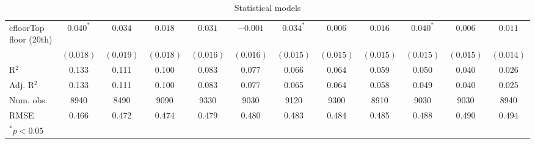 \begin{table}
\begin{center}
\begin{tabular}{l c c c c c c c c c c c }
cfloorTop floor (20th)                   & $0.040^{*}$  & $0.034$      & $0.018$      & $0.031$      & $-0.001$     & $0.034^{*}$  & $0.006$      & $0.016$      & $0.040^{*}$  & $0.006$      & $0.011$      \\
                                         & $(0.018)$    & $(0.019)$    & $(0.018)$    & $(0.016)$    & $(0.016)$    & $(0.015)$    & $(0.015)$    & $(0.015)$    & $(0.015)$    & $(0.015)$    & $(0.014)$    \\
\hline
R$^2$                                    & 0.133        & 0.111        & 0.100        & 0.083        & 0.077        & 0.066        & 0.064        & 0.059        & 0.050        & 0.040        & 0.026        \\
Adj. R$^2$                               & 0.133        & 0.111        & 0.100        & 0.083        & 0.077        & 0.065        & 0.064        & 0.058        & 0.049        & 0.040        & 0.025        \\
Num. obs.                                & 8940         & 8490         & 9090         & 9330         & 9030         & 9120         & 9300         & 8910         & 9030         & 9030         & 8940         \\
RMSE                                     & 0.466        & 0.472        & 0.474        & 0.479        & 0.480        & 0.483        & 0.484        & 0.485        & 0.488        & 0.490        & 0.494        \\
\hline
\multicolumn{12}{l}{\scriptsize{$^*p<0.05$}}
\end{tabular}
\caption{Statistical models}
\label{table:coefficients}
\end{center}
\end{table}
